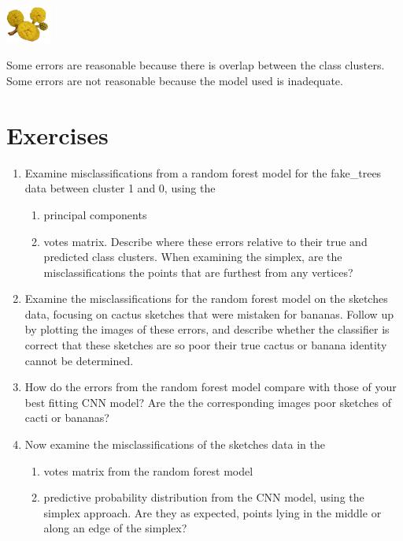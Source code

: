 \documentclass[
  letterpaper,
]{krantz}
\providecommand{\tightlist}{%
  \setlength{\itemsep}{0pt}\setlength{\parskip}{0pt}}\usepackage{longtable,booktabs,array}
\newcommand{\infobox}[1]{%
\noindent\colorbox{info!30}{%
\begin{minipage}{0.98\linewidth}%
    \centering%
    \begin{minipage}[c]{0.15\linewidth} %
      \includegraphics[width=1.5cm]{images/mulga-flowers2.png} %
    \end{minipage}%
    \hfill %
    \begin{minipage}[c]{0.8\linewidth} %
      \bigskip%
      \textsf{#1}%
      \bigskip%
    \end{minipage}%
    \hspace*{3mm}%
  \end{minipage}%
}%
}
\begin{document}
\infobox{Some errors are reasonable because there is overlap between the class clusters. Some errors are not reasonable because the model used is inadequate.
}

\hypertarget{exercises-10}{%
\section*{Exercises}\label{exercises-10}}


\begin{enumerate}
\def\labelenumi{\arabic{enumi}.}
\tightlist
\item
  Examine misclassifications from a random forest model for the
  fake\_trees data between cluster 1 and 0, using the

  \begin{enumerate}
  \def\labelenumii{\alph{enumii}.}
  \tightlist
  \item
    principal components
  \item
    votes matrix. Describe where these errors relative to their true and
    predicted class clusters. When examining the simplex, are the
    misclassifications the points that are furthest from any vertices?
  \end{enumerate}
\item
  Examine the misclassifications for the random forest model on the
  sketches data, focusing on cactus sketches that were mistaken for
  bananas. Follow up by plotting the images of these errors, and
  describe whether the classifier is correct that these sketches are so
  poor their true cactus or banana identity cannot be determined.
\item
  How do the errors from the random forest model compare with those of
  your best fitting CNN model? Are the the corresponding images poor
  sketches of cacti or bananas?
\item
  Now examine the misclassifications of the sketches data in the

  \begin{enumerate}
  \def\labelenumii{\alph{enumii}.}
  \tightlist
  \item
    votes matrix from the random forest model
  \item
    predictive probability distribution from the CNN model, using the
    simplex approach. Are they as expected, points lying in the middle
    or along an edge of the simplex?
  \end{enumerate}
\end{enumerate}
\end{document}
